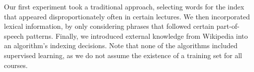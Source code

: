 

Our first experiment took a traditional approach, selecting words for
the index that appeared disproportionately often in certain
lectures. We then incorporated lexical information, by only
considering phrases that followed certain part-of-speech
patterns. Finally, we introduced external knowledge from Wikipedia
into an algorithm's indexing decisions. Note that none of the
algorithms included supervised learning, as we do not assume the
existence of a training set for all courses.



